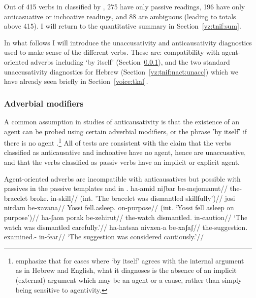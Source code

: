 
Out of 415 verbs in {\tnif} classified by \cite{ahdoutkastner19nels}, 275 have only passive readings, 196 have only anticasuative or inchoative readings, and 88 are ambiguous (leading to totals above 415). I will return to the quantitative summary in Section~\ref{vz:tnif:sum}.

In what follows I will introduce the unaccusativity and anticausativity diagnostics used to make sense of the different verbs. These are: compatibility with agent-oriented adverbs including `by itself’ (Section~\ref{vz:tnif:nact:adv}), and the two standard unaccusativity diagnostics for Hebrew (Section~\ref{vz:tnif:nact:unacc}) which we have already seen briefly in Section~\ref{voice:tkal}.


	\subsubsection{Adverbial modifiers} \label{vz:tnif:nact:adv}
A common assumption in studies of anticausativity is that the existence of an agent can be probed using certain adverbial modifiers, or the phrase 'by itself' if there is no agent \citep{unaccusativity95,alexiadouanagnostopoulou04,layering15,alexiadoudoron12,koontzgarboden09,kastner17gjgl}.\footnote{\cite{layering15} emphasize that for cases where `by itself' agrees with the internal argument as in Hebrew and English, what it diagnoses is the absence of an implicit (external) argument which may be an agent or a cause, rather than simply being sensitive to agentivity.}  All of tests are consistent with the claim that the verbs classified as anticausative and inchoative have no agent, hence are unaccusative, and that the verbs classified as passiv verbs have an implicit or explicit agent.

Agent-oriented adverbs are incompatible with anticausatives but possible with passives in the passive templates and in {\tnif}.
\pex 
	\a	\ljudge{*} \begingl
		\gla ha-{\ts}amid niʃbar be-mejomanut//
		\glb the-bracelet broke. in-skill//
		\glft (int. 'The bracelet was dismantled skillfully')//
		\endgl
	\a {} \begingl
		\gla josi nirdam be-xavana//
		\glb Yossi fell.asleep. on-purpose//
		\glft (int. `Yossi fell asleep on purpose')//
		\endgl
\xe
\pex
	\a	\begingl
		\gla ha-ʃaon porak be-zehirut//
		\glb the-watch dismantled. in-caution//
		\glft `The watch was dismantled carefully.'//
		\endgl
	\a
		\begingl
		\gla ha-hatsaa nivxen-a be-xaʃaʃ//
		\glb the-suggestion. examined.- in-fear//
		\glft `The suggestion was considered cautiously.'//
		\endgl
\xe

